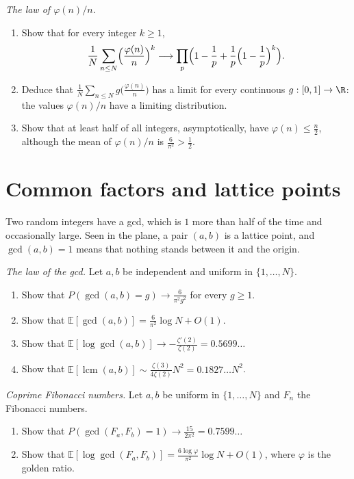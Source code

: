 \begin{exercise}[$\star\star$]\label{pb:phiovern}
\emph{The law of $\varphi(n)/n$.}
\begin{enumerate}[label=(\alph*)]
\item Show that for every integer $k\ge1$,
\[
\frac1N\sum_{n\le N}\Bigl(\frac{\varphi(n)}n\Bigr)^k\longrightarrow\prod_p\Bigl(1-\frac1p+\frac1p\Bigl(1-\frac1p\Bigr)^k\Bigr).
\]
\item Deduce that $\frac1N\sum_{n\le N}g\bigl(\frac{\varphi(n)}n\bigr)$ has a limit for every continuous $g:[0,1]\to\R$: the values
$\varphi(n)/n$ have a limiting distribution.
\item Show that at least half of all integers, asymptotically, have $\varphi(n)\le\frac n2$, although the mean of
$\varphi(n)/n$ is $\frac6{\pi^2}>\frac12$.
\end{enumerate}
\end{exercise}

\section{Common factors and lattice points}

Two random integers have a gcd, which is $1$ more than half of the time and occasionally large. Seen in the plane, a pair
$(a,b)$ is a lattice point, and $\gcd(a,b)=1$ means that nothing stands between it and the origin.

\begin{exercise}[$\star\star$]\label{pb:gcdmean}
\emph{The law of the gcd.} Let $a,b$ be independent and uniform in $\{1,\dots,N\}$.
\begin{enumerate}[label=(\alph*)]
\item Show that $P(\gcd(a,b)=g)\to\frac6{\pi^2g^2}$ for every $g\ge1$.
\item Show that $\mathbb E[\gcd(a,b)]=\frac6{\pi^2}\log N+O(1)$.
\item Show that $\mathbb E[\log\gcd(a,b)]\to-\frac{\zeta'(2)}{\zeta(2)}=0.5699\ldots$
\item Show that $\mathbb E[\operatorname{lcm}(a,b)]\sim\frac{\zeta(3)}{4\zeta(2)}N^2=0.1827\ldots N^2$.
\end{enumerate}
\end{exercise}

\begin{exercise}[$\star$]\label{pb:fibcoprime}
\emph{Coprime Fibonacci numbers.} Let $a,b$ be uniform in $\{1,\dots,N\}$ and $F_n$ the Fibonacci numbers.
\begin{enumerate}[label=(\alph*)]
\item Show that $P(\gcd(F_a,F_b)=1)\to\frac{15}{2\pi^2}=0.7599\ldots$
\item Show that $\mathbb E[\log\gcd(F_a,F_b)]=\frac{6\log\varphi}{\pi^2}\log N+O(1)$, where $\varphi$ is the golden ratio.
\end{enumerate}
\end{exercise}

